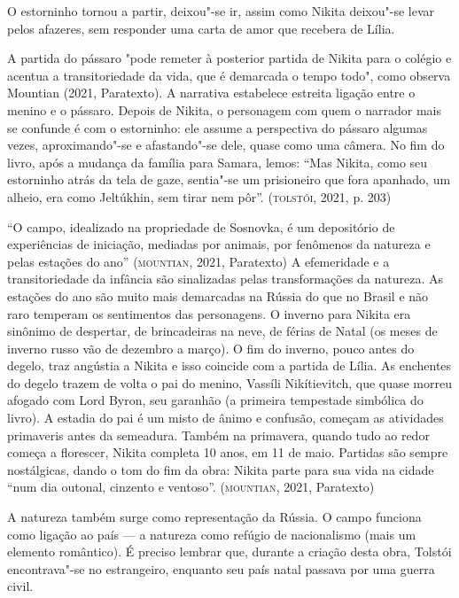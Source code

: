 \documentclass[11pt]{extarticle}
\begin{document}
\begin{enumerate}
O estorninho tornou a partir, deixou"-se ir, assim como Nikita deixou"-se
levar pelos afazeres, sem responder uma carta de amor que recebera de
Lília.

A partida do pássaro "pode remeter à posterior partida de Nikita para o colégio e acentua a transitoriedade da vida, que é demarcada o tempo todo", como observa
Mountian (2021, Paratexto). A narrativa estabelece estreita ligação
entre o menino e o pássaro. Depois de Nikita, o personagem com quem o
narrador mais se confunde é com o estorninho: ele assume a perspectiva
do pássaro algumas vezes, aproximando"-se e afastando"-se dele,
quase como uma câmera. No fim do livro, após a mudança da família para
Samara, lemos: ``Mas Nikita, como seu estorninho atrás da tela de gaze,
sentia"-se um prisioneiro que fora apanhado, um alheio, era como
Jeltúkhin, sem tirar nem pôr''. (\textsc{tolstói}, 2021, p. 203)

``O campo, idealizado na propriedade de Sosnovka, é um depositório de
experiências de iniciação, mediadas por animais, por fenômenos da
natureza e pelas estações do ano'' (\textsc{mountian}, 2021, Paratexto) A
efemeridade e a transitoriedade da infância são sinalizadas pelas
transformações da natureza. As estações do ano são muito mais demarcadas
na Rússia do que no Brasil e não raro temperam os sentimentos das
personagens. O inverno para Nikita era sinônimo de despertar, de
brincadeiras na neve, de férias de Natal (os meses de inverno russo vão
de dezembro a março). O fim do inverno, pouco antes do degelo, traz
angústia a Nikita e isso coincide com a partida de Lília. As enchentes
do degelo trazem de volta o pai do menino, Vassíli Nikítievitch, que
quase morreu afogado com Lord Byron, seu garanhão (a primeira tempestade
simbólica do livro). A estadia do pai é um misto de ânimo e confusão,
começam as atividades primaveris antes da semeadura. Também na
primavera, quando tudo ao redor começa a florescer, Nikita completa 10
anos, em 11 de maio. Partidas são sempre nostálgicas, dando o tom do fim
da obra: Nikita parte para sua vida na cidade ``num dia outonal,
cinzento e ventoso''. (\textsc{mountian}, 2021, Paratexto)


A natureza também surge como representação da Rússia. O campo funciona
como ligação ao país --- a natureza como refúgio de nacionalismo (mais
um elemento romântico). É preciso lembrar que, durante a criação desta
obra, Tolstói encontrava"-se no estrangeiro, enquanto seu país natal
passava por uma guerra civil.


\end{enumerate}
\end{document}
